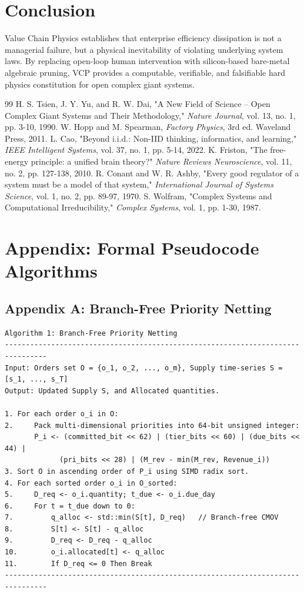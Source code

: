 \documentclass[11pt,a4paper]{article}
\begin{document}
\section{Conclusion}
Value Chain Physics establishes that enterprise efficiency dissipation is not a managerial failure, but a physical inevitability of violating underlying system laws. By replacing open-loop human intervention with silicon-based bare-metal algebraic pruning, VCP provides a computable, verifiable, and falsifiable hard physics constitution for open complex giant systems.

\newpage
\begin{thebibliography}{99}
 H. S. Tsien, J. Y. Yu, and R. W. Dai, "A New Field of Science -- Open Complex Giant Systems and Their Methodology," \textit{Nature Journal}, vol. 13, no. 1, pp. 3-10, 1990.
 W. Hopp and M. Spearman, \textit{Factory Physics}, 3rd ed. Waveland Press, 2011.
 L. Cao, "Beyond i.i.d.: Non-IID thinking, informatics, and learning," \textit{IEEE Intelligent Systems}, vol. 37, no. 1, pp. 5-14, 2022.
 K. Friston, "The free-energy principle: a unified brain theory?" \textit{Nature Reviews Neuroscience}, vol. 11, no. 2, pp. 127-138, 2010.
 R. Conant and W. R. Ashby, "Every good regulator of a system must be a model of that system," \textit{International Journal of Systems Science}, vol. 1, no. 2, pp. 89-97, 1970.
 S. Wolfram, "Complex Systems and Computational Irreducibility," \textit{Complex Systems}, vol. 1, pp. 1-30, 1987.
\end{thebibliography}

\newpage
\section*{Appendix: Formal Pseudocode Algorithms}

\subsection*{Appendix A: Branch-Free Priority Netting}
\begin{verbatim}
Algorithm 1: Branch-Free Priority Netting
--------------------------------------------------------------------------------
Input: Orders set O = {o_1, o_2, ..., o_m}, Supply time-series S = [s_1, ..., s_T]
Output: Updated Supply S, and Allocated quantities.

1. For each order o_i in O:
2.     Pack multi-dimensional priorities into 64-bit unsigned integer:
       P_i <- (committed_bit << 62) | (tier_bits << 60) | (due_bits << 44) |
             (pri_bits << 28) | (M_rev - min(M_rev, Revenue_i))
3. Sort O in ascending order of P_i using SIMD radix sort.
4. For each sorted order o_i in O_sorted:
5.     D_req <- o_i.quantity; t_due <- o_i.due_day
6.     For t = t_due down to 0:
7.         q_alloc <- std::min(S[t], D_req)   // Branch-free CMOV
8.         S[t] <- S[t] - q_alloc
9.         D_req <- D_req - q_alloc
10.        o_i.allocated[t] <- q_alloc
11.        If D_req <= 0 Then Break
--------------------------------------------------------------------------------
\end{verbatim}
\end{document}
